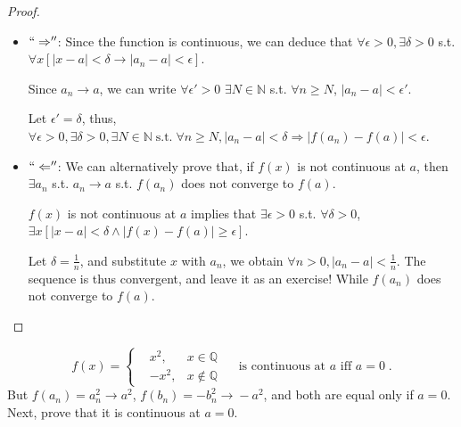 \documentclass[12pt]{report}
\theoremstyle{definition}
\begin{document}
\begin{proof} 
    \;

    \begin{itemize}
            \item $``\Rightarrow''$:
                Since the function is continuous, we can deduce that
                $\forall \epsilon > 0, \exists \delta > 0$ 
                s.t. $\forall x [|x-a| < \delta \rightarrow |a_n - a|<\epsilon]$.

                Since $a_n \rightarrow a$, we can write $\forall \epsilon' > 0$
                $\exists N \in \mathbb{N}$ s.t. $\forall n \ge N$, $|a_n - a| < \epsilon'$.

                Let $\epsilon' = \delta$, thus, $
                    \forall \epsilon > 0, \exists \delta > 0, \exists N \in \mathbb{N} \;\text{s.t.}\;
                    \forall n \ge N, |a_n - a| < \delta \Rightarrow
                    |f(a_n)-f(a)| < \epsilon$.
                
            \item $``\Leftarrow''$:
                We can alternatively prove that,
                if $f(x)$ is not continuous at $a$, 
                then $\exists a_n$ s.t. $a_n\rightarrow a$ s.t. 
                $f(a_n)$ does not converge to $f(a)$.

                $f(x)$ is not continuous at $a$ implies that
                $\exists \epsilon > 0$ s.t.  $\forall \delta > 0$,
                $\exists x [ |x-a|<\delta \wedge |f(x)-f(a)|\ge\epsilon ]$.

                Let $\delta = \frac{1}{n}$, and substitute $x$ with $a_n$,
                we obtain $\forall n > 0, |a_n - a|<\frac{1}{n}$.
                The sequence is thus convergent, and leave it as an exercise!
                While $f(a_n)$ does not converge to $f(a)$.
    \end{itemize}
\end{proof}

\begin{ex}
    \[
        f(x) = \left\{
            \begin{align*}
                & x^{2}, & x\in \mathbb{Q} \\
                & -x^{2}, & x\notin \mathbb{Q}
            \end{align*}
            \right. \quad\;\text{is continuous at $a$ iff $a=0$}\;.
    \]
    But $f(a_n) = a^{2}_n \rightarrow{}a^{2}$,
    $f(b_n) = -b^{2}_n \rightarrow{} -a^{2}$,
    and both are equal only if $a = 0$.
    Next, prove that it is continuous at $a = 0$.
\end{ex}
\end{document}
